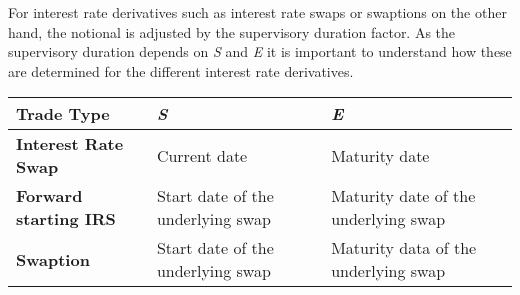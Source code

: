     
    For interest rate derivatives such as interest rate swaps or swaptions
on the other hand, the notional is adjusted by the supervisory duration
factor. As the supervisory duration depends on \emph{S} and \emph{E} it
is important to understand how these are determined for the different
interest rate derivatives.

\begin{longtable}[]{@{}lll@{}}
\toprule
\begin{minipage}[b]{0.24\columnwidth}\raggedright
Trade Type\strut
\end{minipage} & \begin{minipage}[b]{0.32\columnwidth}\raggedright
\emph{S}\strut
\end{minipage} & \begin{minipage}[b]{0.36\columnwidth}\raggedright
\emph{E}\strut
\end{minipage}\tabularnewline
\midrule
\endhead
\begin{minipage}[t]{0.24\columnwidth}\raggedright
\textbf{Interest Rate Swap}\strut
\end{minipage} & \begin{minipage}[t]{0.32\columnwidth}\raggedright
Current date\strut
\end{minipage} & \begin{minipage}[t]{0.36\columnwidth}\raggedright
Maturity date\strut
\end{minipage}\tabularnewline
\begin{minipage}[t]{0.24\columnwidth}\raggedright
\textbf{Forward starting IRS}\strut
\end{minipage} & \begin{minipage}[t]{0.32\columnwidth}\raggedright
Start date of the underlying swap\strut
\end{minipage} & \begin{minipage}[t]{0.36\columnwidth}\raggedright
Maturity date of the underlying swap\strut
\end{minipage}\tabularnewline
\begin{minipage}[t]{0.24\columnwidth}\raggedright
\textbf{Swaption}\strut
\end{minipage} & \begin{minipage}[t]{0.32\columnwidth}\raggedright
Start date of the underlying swap\strut
\end{minipage} & \begin{minipage}[t]{0.36\columnwidth}\raggedright
Maturity data of the underlying swap\strut
\end{minipage}\tabularnewline
\bottomrule
\end{longtable}

